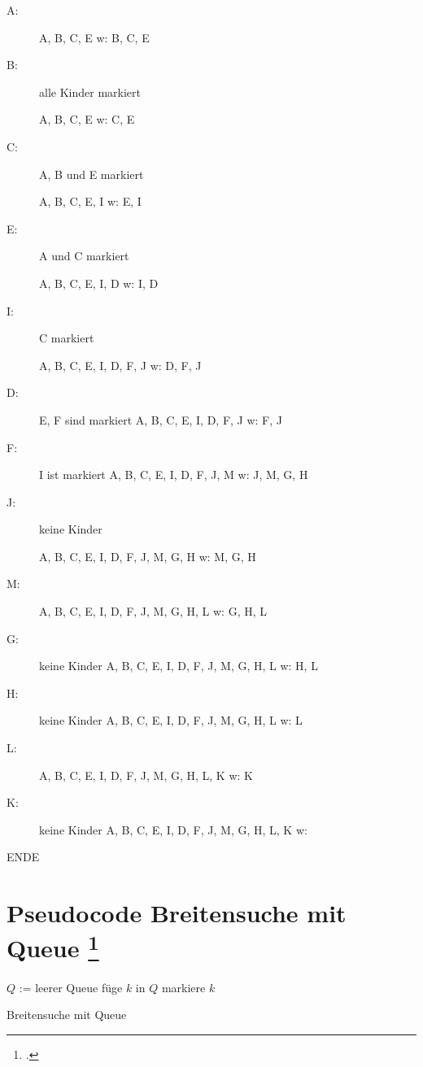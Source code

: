 \documentclass{lehramt-informatik-haupt}
\begin{document}
\begin{description}

\item[A:]
A, B, C, E
w: B, C, E

\item[B:] alle Kinder markiert

A, B, C, E
w: C, E

\item[C:] A, B und E markiert

A, B, C, E, I
w: E, I

\item[E:] A und C markiert

A, B, C, E, I, D
w: I, D

\item[I:] C markiert

A, B, C, E, I, D, F, J
w: D, F, J

\item[D:] E, F sind markiert
A, B, C, E, I, D, F, J
w: F, J

\item[F:] I ist markiert
A, B, C, E, I, D, F, J, M
w: J, M, G, H

\item[J:] keine Kinder

A, B, C, E, I, D, F, J, M,
G, H
w: M, G, H

\item[M:]

A, B, C, E, I, D, F, J, M, G, H, L
w: G, H, L

\item[G:] keine Kinder
A, B, C, E, I, D, F, J, M, G, H, L
w: H, L

\item[H:] keine Kinder
A, B, C, E, I, D, F, J, M, G, H, L
w: L

\item[L:]
A, B, C, E, I, D, F, J, M, G, H, L, K
w: K

\item[K:] keine Kinder
A, B, C, E, I, D, F, J, M, G, H, L, K
w:
\end{description}

ENDE

\section{Pseudocode Breitensuche mit Queue
\footcite[Seite 64]{aud:fs:6}}

\begin{algorithm}[H]
  $Q$ := leerer Queue\;
  füge $k$ in $Q$\;
  markiere $k$\;
\caption{Breitensuche mit Queue}
\end{algorithm}


\literatur
\end{document}

